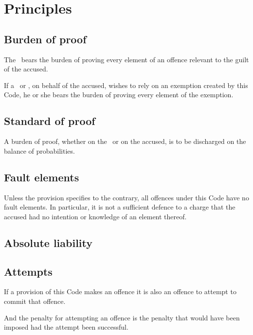 \documentclass[12pt]{report}
\begin{document}
  \chapter{Principles}
  \section{Burden of proof}
  \begin{fenumerate}\item
  The \Referee\ bears the burden of proving every element of an offence relevant to the guilt of the accused.
  \item If a \Captain\ or \President, on behalf of the accused, wishes to rely on an exemption created by this Code, he or she bears the burden of proving every element of the exemption.
  \end{fenumerate}
  \section{Standard of proof}
    \begin{fenumerate}\item
  A burden of proof, whether on the \Referee\ or on the accused, is to be discharged on the balance of probabilities.\end{fenumerate}
  \section{Fault elements}
    \begin{fenumerate}\item
  Unless the provision specifies to the contrary,  all offences under this Code have no fault elements. In particular, it is not a sufficient defence to a charge that the accused had no intention or knowledge of an element thereof.
  \end{fenumerate}
  \section{Absolute liability}%
  \section{Attempts}
  \begin{fenumerate}
    \item If a provision of this Code makes an offence it is also an offence to attempt to commit that offence.

    And the penalty for attempting an offence is the penalty that would have been imposed had the attempt been successful.
  \end{fenumerate}
\end{document}
